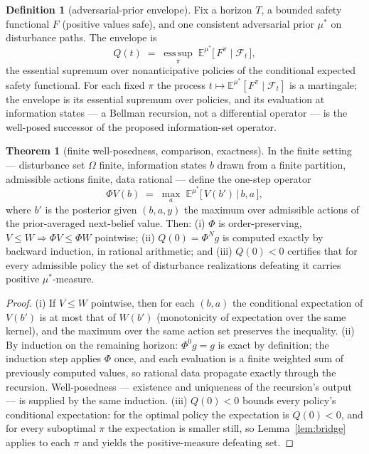 \documentclass[10pt,twocolumn]{article}
\theoremstyle{definition}
\newtheorem{theorem}{Theorem}
\newtheorem{definition}{Definition}
\begin{document}
\begin{definition}[adversarial-prior envelope]\label{def:envelope}
Fix a horizon $T$, a bounded safety functional $F$ (positive values safe),
and one consistent adversarial prior $\mu^{*}$ on disturbance paths. The
envelope is
\[
Q(t) \;=\; \operatorname*{ess\,sup}_{\pi} \;
\mathbb{E}^{\mu^{*}}\bigl[\, F^{\pi} \;\big|\; \mathcal{F}_{t} \,\bigr],
\]
the essential supremum over nonanticipative policies of the conditional
expected safety functional. For each fixed $\pi$ the process
$t \mapsto \mathbb{E}^{\mu^{*}}[F^{\pi} \mid \mathcal{F}_{t}]$ is a
martingale; the envelope is its essential supremum over policies, and its
evaluation at information states --- a Bellman recursion, not a
differential operator --- is the well-posed successor of the proposed
information-set operator.
\end{definition}

\begin{theorem}[finite well-posedness, comparison, exactness]
\label{thm:envelope-finite}
In the finite setting --- disturbance set $\Omega$ finite, information
states $b$ drawn from a finite partition, admissible actions finite, data
rational --- define the one-step operator
\[
\Phi V(b) \;=\; \max_{a}\; \mathbb{E}^{\mu^{*}}\bigl[\, V(b') \,\big|\, b, a \,\bigr],
\]
where $b'$ is the posterior given $(b, a, y)$
the maximum over admissible actions of the prior-averaged next-belief
value. Then: (i) $\Phi$ is order-preserving,
$V \le W \Rightarrow \Phi V \le \Phi W$ pointwise; (ii)
$Q(0) = \Phi^{N} g$ is computed exactly by backward induction, in rational
arithmetic; and (iii) $Q(0) < 0$ certifies that for every admissible policy
the set of disturbance realizations defeating it carries positive
$\mu^{*}$-measure.
\end{theorem}
\begin{proof}
(i) If $V \le W$ pointwise, then for each $(b, a)$ the conditional
expectation of $V(b')$ is at most that of $W(b')$ (monotonicity of
expectation over the same kernel), and the maximum over the same action set
preserves the inequality. (ii) By induction on the remaining horizon:
$\Phi^{0} g = g$ is exact by definition; the induction step applies $\Phi$
once, and each evaluation is a finite weighted sum of previously computed
values, so rational data propagate exactly through the recursion.
Well-posedness --- existence and uniqueness of the recursion's output ---
is supplied by the same induction. (iii) $Q(0) < 0$ bounds every policy's
conditional expectation: for the optimal policy the expectation is
$Q(0) < 0$, and for every suboptimal $\pi$ the expectation is smaller
still, so Lemma~\ref{lem:bridge} applies to each $\pi$ and yields the
positive-measure defeating set.
\end{proof}
\end{document}
